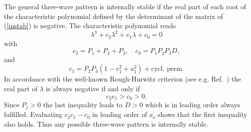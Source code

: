 The general three-wave pattern is internally stable if the real part
of each root of the characteristic polynomial defined by the
determinant of the matrix of (\ref{instab}) is negative. The
characteristic polynomial reads
\begin{equation}
  \lambda^3+c_2\lambda^2+c_1\lambda+c_0=0
  \label{APE.cP}
\end{equation}
with
\begin{equation}
  c_2=P_1+P_2+P_3,\quad c_0=P_1P_2P_3D,
  \label{APE.c20}
\end{equation}
and
\begin{equation}
  c_1=P_2P_3(1-v_1^2+u_1^2)+\mbox{cycl. perm.}
  \label{APE.c1}
\end{equation}
In accordance with the well-known Rough-Hurwitz criterion (see e.g.
Ref.~) the real
part of $\lambda$ is always negative if and only if
\begin{equation}
  c_2c_1>c_0>0.
  \label{APE.RH}
\end{equation}
Since $P_j>0$ the last inequality leads to $D>0$ which is in
leading order always fulfilled. Evaluating $c_2c_1-c_0$ in leading
order of $a_s$ shows that the first inequality also holds. Thus any
possible three-wave pattern is internally stable.


